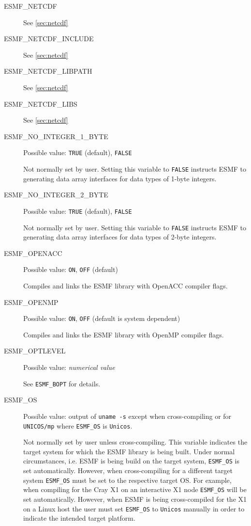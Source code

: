 \begin{description}
\item[ESMF\_NETCDF]
See \ref{sec:netcdf}

\item[ESMF\_NETCDF\_INCLUDE]
See \ref{sec:netcdf}

\item[ESMF\_NETCDF\_LIBPATH]
See \ref{sec:netcdf}

\item[ESMF\_NETCDF\_LIBS]
See \ref{sec:netcdf}

\item[ESMF\_NO\_INTEGER\_1\_BYTE]
Possible value: {\tt TRUE} (default), {\tt FALSE}

Not normally set by user. Setting this variable to {\tt FALSE} instructs
ESMF to generating data array interfaces for data types of 1-byte integers.

\item[ESMF\_NO\_INTEGER\_2\_BYTE]
Possible value: {\tt TRUE} (default), {\tt FALSE}

Not normally set by user. Setting this variable to {\tt FALSE} instructs
ESMF to generating data array interfaces for data types of 2-byte integers.

\item[ESMF\_OPENACC]
Possible value: {\tt ON}, {\tt OFF} (default)

Compiles and links the ESMF library with OpenACC compiler flags.

\item[ESMF\_OPENMP]
Possible value: {\tt ON}, {\tt OFF} (default is system dependent)

Compiles and links the ESMF library with OpenMP compiler flags.

\item[ESMF\_OPTLEVEL]
Possible value: {\em numerical value}

See {\tt ESMF\_BOPT} for details.

\item[ESMF\_OS]
Possible value: output of {\tt uname -s} except when cross-compiling or for
{\tt UNICOS/mp} where {\tt ESMF\_OS} is {\tt Unicos}.

Not normally set by user unless cross-compiling. This variable indicates the
target system for which the ESMF library is being built. Under normal
circumstances, i.e. ESMF is being build on the target system, {\tt ESMF\_OS} is
set automatically. However, when cross-compiling for a different target system
{\tt ESMF\_OS} must be set to the respective target OS. For example, when
compiling for the Cray X1 on an interactive X1 node {\tt ESMF\_OS} will be set
automatically. However, when ESMF is being cross-compiled for the X1 on a Linux
host the user must set {\tt ESMF\_OS} to {\tt Unicos} manually in order to
indicate the intended target platform.


\end{description}
